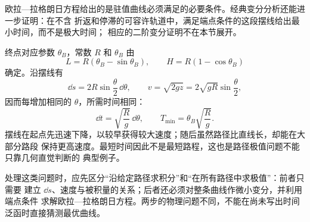 \documentclass[UTF8,zihao=-4,oneside,openany]{ctexbook}
\begin{document}
欧拉—拉格朗日方程给出的是驻值曲线必须满足的必要条件。经典变分分析还能进一步证明：在不含
折返和停滞的可容许轨道中，满足端点条件的这段摆线给出最小时间，而不是极大时间；
相应的二阶变分证明不在本节展开。

\begin{center}
\end{center}

终点对应参数 $\theta_B$，常数 $R$ 和 $\theta_B$ 由
\begin{equation}
  L=R(\theta_B-\sin\theta_B),
  \qquad
  H=R(1-\cos\theta_B)
  \label{eq:cycloid-endpoint-conditions}
\end{equation}
确定。沿摆线有
\[
  \dd s=2R\sin\frac\theta2\,\dd\theta,
  \qquad
  v=\sqrt{2gz}=2\sqrt{gR}\sin\frac\theta2,
\]
因而每增加相同的 $\theta$，所需时间相同：
\begin{equation}
  \dd t=\sqrt{\frac Rg}\,\dd\theta,
  \qquad
  T_{\min}=\theta_B\sqrt{\frac Rg}.
  \label{eq:brachistochrone-minimum-time}
\end{equation}
摆线在起点先迅速下降，以较早获得较大速度；随后虽然路径比直线长，却能在大部分路段
保持更高速度。最短时间因此不是最短路程，这也是路径极值问题不能只靠几何直觉判断的
典型例子。

处理这类问题时，应先区分“沿给定路径求积分”和“在所有路径中求极值”：前者只需要
建立 $\dd s$、速度与被积量的关系；后者还必须对整条曲线作微小变分，并利用端点条件
求解欧拉—拉格朗日方程。两步的物理问题不同，不能在尚未写出时间泛函时直接猜测最优曲线。
\end{document}
